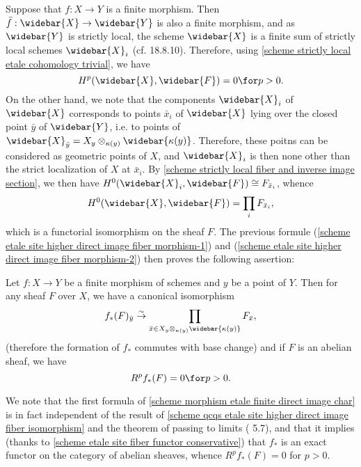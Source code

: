 Suppose that $f:X\to Y$ is a finite morphism. Then $\bar{f}:\widebar{X}\to\widebar{Y}$ is also a finite morphism, and as $\widebar{Y}$ is strictly local, the scheme $\widebar{X}$ is a finite sum of strictly local schemes $\widebar{X}_i$ (cf. \cite{EGA4-4} 18.8.10). Therefore, using \cref{scheme strictly local etale cohomology trivial}, we have
\begin{equation}\label{scheme morphism etale finite direct image char-1}
H^p(\widebar{X},\widebar{F})=0\for p>0.
\end{equation}
On the other hand, we note that the components $\widebar{X}_i$ of $\widebar{X}$ corresponds to points $\bar{x}_i$ of $\widebar{X}$ lying over the closed point $\bar{y}$ of $\widebar{Y}$, i.e. to points of $\widebar{X}_{\bar{y}}=X_y\otimes_{\kappa(y)}\widebar{\kappa(y)}$. Therefore, these poitns can be considered as geometric points of $X$, and $\widebar{X}_i$ is then none other than the strict localization of $X$ at $\bar{x}_i$. By \cref{scheme strictly local fiber and inverse image section}, we then have $H^0(\widebar{X}_i,\widebar{F})\cong F_{\bar{x}_i}$, whence
\begin{equation}\label{scheme morphism etale finite direct image char-2}
H^0(\widebar{X},\widebar{F})=\prod_iF_{\bar{x}_i},
\end{equation}
which is a functorial isomorphism on the sheaf $F$. The previous formule (\ref{scheme etale site higher direct image fiber morphism-1}) and (\ref{scheme etale site higher direct image fiber morphism-2}) then proves the following assertion:

\begin{proposition}\label{scheme morphism etale finite direct image char}
Let $f:X\to Y$ be a finite morphism of schemes and $y$ be a point of $Y$. Then for any sheaf $F$ over $X$, we have a canonical isomorphism
\begin{equation}\label{scheme morphism etale finite direct image char-3}
f_*(F)_{\bar{y}}\stackrel{\sim}{\to} \prod_{\bar{x}\in X_y\otimes_{\kappa(y)}\widebar{\kappa(y)}}F_{\bar{x}},
\end{equation}
(therefore the formation of $f_*$ commutes with base change) and if $F$ is an abelian sheaf, we have 
\begin{equation}\label{scheme morphism etale finite direct image char-4}
R^pf_*(F)=0\for p>0.
\end{equation}
\end{proposition}

We note that the first formula of \cref{scheme morphism etale finite direct image char} is in fact independent of the result of \cref{scheme qcqs etale site higher direct image fiber isomorphism} and the theorem of passing to limits (\cite{SGA4-2}  5.7), and that it implies (thanks to \cref{scheme etale site fiber functor conservative}) that $f_*$ is an exact functor on the category of abelian sheaves, whence $R^pf_*(F)=0$ for $p>0$.

